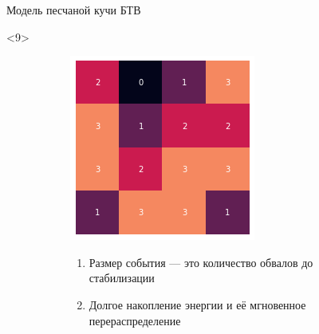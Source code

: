 \documentclass{beamer}
\begin{document}
\begin{frame}{Модель песчаной кучи БТВ}
		\begin{onlyenv}<9>
			\begin{figure}[ht]
				\centering
				\begin{subfigure}{0.45\textwidth}
					\includegraphics[width=\linewidth]{slides/btw_8}
				\end{subfigure}
				\begin{subfigure}{0.45\textwidth}
					\begin{enumerate}
						\item Размер события --- это количество обвалов до стабилизации
						\item Долгое накопление энергии и её мгновенное перераспределение
					\end{enumerate}
				\end{subfigure}
			\end{figure}
		\end{onlyenv}
	\end{frame}
\end{document}
